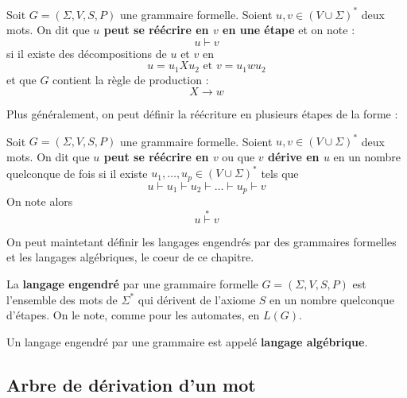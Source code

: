 \begin{definition}
    Soit $ G = (\Sigma, V, S, P)$ une grammaire formelle. Soient $u,v \in \left( V \cup \Sigma \right)^*$ deux mots. 
    On dit que \textbf{$u$ peut se réécrire en $v$ en une étape} et on note :
        \[ u \vdash v \] 
    si il existe des décompositions de $u$ et $v$ en 
        \[ u = u_1 X u_2 \text{ et } v = u_1 w u_2 \] 
    et que $G$ contient la règle de production :
        \[ X \longrightarrow w \] 
\end{definition}

\newpage 

Plus généralement, on peut définir la réécriture en plusieurs étapes de la forme : 

\begin{definition}[Réécriture (2)]
    Soit $ G = (\Sigma, V, S, P)$ une grammaire formelle. Soient $u,v \in \left( V \cup \Sigma \right)^*$ deux mots.
    On dit que \textbf{$u$ peut se réécrire en $v$} ou que \textbf{$v$ dérive en $u$} en un nombre quelconque de fois si 
    il existe $u_1, \dots, u_p \in \left( V \cup \Sigma \right)^*$ tels que 
        \[ u \vdash u_1 \vdash u_2 \vdash \dots \vdash u_p \vdash v \] 
    On note alors 
        \[ u \overset{*}{\vdash} v \] 
\end{definition}

On peut maintetant définir les langages engendrés par des grammaires formelles et les langages algébriques, le coeur de ce 
chapitre. 

\begin{definition}
    La \textbf{langage engendré} par une grammaire formelle $ G = (\Sigma, V, S, P)$ est l'ensemble des mots de $\Sigma^*$ 
    qui dérivent de l'axiome $S$ en un nombre quelconque d'étapes. On le note, comme pour les automates, en $L(G)$. 
\end{definition}

\begin{definition}
    Un langage engendré par une grammaire est appelé \textbf{langage algébrique}. 
\end{definition}



\subsection{Arbre de dérivation d'un mot}

